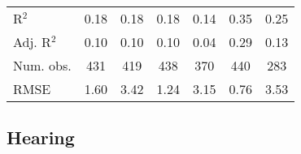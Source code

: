 \documentclass[fullpage]{paper}
\begin{document}
\begin{center}
\begin{longtable}{l c c c c c c }
\hline
R$^2$       & 0.18          & 0.18         & 0.18         & 0.14          & 0.35          & 0.25           \\
Adj. R$^2$  & 0.10          & 0.10         & 0.10         & 0.04          & 0.29          & 0.13           \\
Num. obs.   & 431           & 419          & 438          & 370           & 440           & 283            \\
RMSE        & 1.60          & 3.42         & 1.24         & 3.15          & 0.76          & 3.53           \\
\end{longtable}
\end{center}
\subsection{ Hearing }
\end{document}
